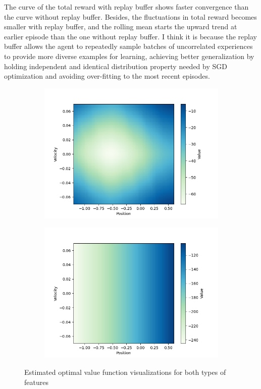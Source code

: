 \documentclass[11pt,addpoints,answers]{exam}
\begin{document}
\begin{questions}
\begin{parts}
    \begin{your_solution}[title=Comment,height=5cm]
        The curve of the total reward with replay buffer shows faster convergence than the curve without replay buffer. Besides, the fluctuations in total reward becomes smaller with replay buffer, and the rolling mean starts the upward trend at earlier episode than the one without replay buffer. I think it is because the replay buffer allows the agent to repeatedly sample batches of uncorrelated experiences to provide more diverse examples for learning, achieving better generalization by holding independent and identical distribution property needed by SGD optimization and avoiding over-fitting to the most recent episodes.
    \end{your_solution}
    
    \clearpage
    \begin{figure}[H]
        \centering
        \begin{subfigure}{0.5\textwidth}
            \hspace{2em}\includegraphics[width=0.8\linewidth]{figs/value_A.png}
            \caption{}
            \label{fig:value_a}
        \end{subfigure}%
        \begin{subfigure}{0.5\textwidth}
            \hspace{2em}\includegraphics[width=0.8\linewidth]{figs/value_B.png}
            \caption{}
            \label{fig:value_b}
        \end{subfigure}
        \caption{Estimated optimal value function visualizations for both types of features}
        \label{fig:value}
    \end{figure}
    

\end{parts}
\end{questions}
\end{document}
